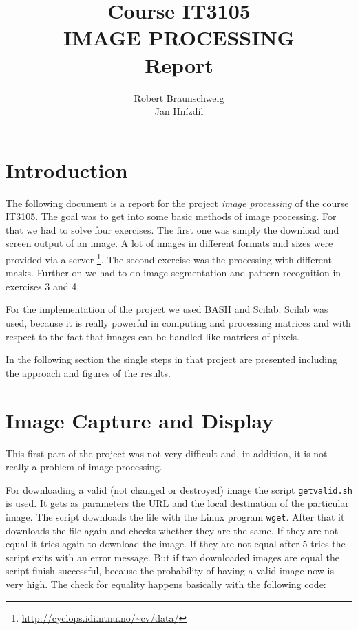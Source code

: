 \documentclass[a4paper,english,11pt,oneside]{article}
\title{Course IT3105 \\ IMAGE PROCESSING \\ Report}
\author{Robert Braunschweig \\ Jan Hn\'{i}zdil}
\date{}
\begin{document}
\lstset{basicstyle=\ttfamily, showspaces=false, tabsize=4}
\maketitle
\thispagestyle{empty}
\cleardoublepage
\tableofcontents
\cleardoublepage
\setcounter{page}{1}

\section{Introduction}
The following document is a report for the project \emph{image processing} of the course IT3105. The goal was to get into some basic methods of image processing. For that we had to solve four exercises. The first one was simply the download and screen output of an image. A lot of images in different formats and sizes were provided via a server \footnote{\url{http://cyclops.idi.ntnu.no/~cv/data/}}. The second exercise was the processing with different masks. Further on we had to do image segmentation and pattern recognition in exercises 3 and 4.

For the implementation of the project we used BASH and Scilab. Scilab was used, because it is really powerful in computing and processing matrices and with respect to the fact that images can be handled like matrices of pixels.

In the following section the single steps in that project are presented including the approach and figures of the results.

\section{Image Capture and Display}
This first part of the project was not very difficult and, in addition, it is not really a problem of image processing.

For downloading a valid (not changed or destroyed) image the script \lstinline&get&\-\lstinline&valid.sh& is used. It gets as parameters the URL and the local destination of the particular image. The script downloads the file with the Linux program \lstinline&wget&. After that it downloads the file again and checks whether they are the same. If they are not equal it tries again to download the image. If they are not equal after 5 tries the script exits with an error message. But if two downloaded images are equal the script finish successful, because the probability of having a valid image now is very high. The check for equality happens basically with the following code:
\end{document}
